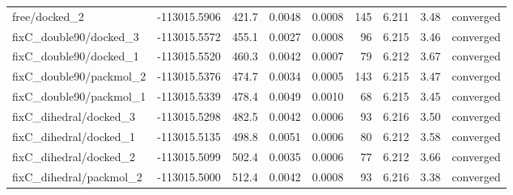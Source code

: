 \begin{longtable}{@{}lrrrrrrrl@{}}
free/docked\_2 & -113015.5906 & 421.7 & 0.0048 & 0.0008 & 145 & 6.211 & 3.48 & converged \\
fixC\_double90/docked\_3 & -113015.5572 & 455.1 & 0.0027 & 0.0008 & 96 & 6.215 & 3.46 & converged \\
fixC\_double90/docked\_1 & -113015.5520 & 460.3 & 0.0042 & 0.0007 & 79 & 6.212 & 3.67 & converged \\
fixC\_double90/packmol\_2 & -113015.5376 & 474.7 & 0.0034 & 0.0005 & 143 & 6.215 & 3.47 & converged \\
fixC\_double90/packmol\_1 & -113015.5339 & 478.4 & 0.0049 & 0.0010 & 68 & 6.215 & 3.45 & converged \\
fixC\_dihedral/docked\_3 & -113015.5298 & 482.5 & 0.0042 & 0.0006 & 93 & 6.216 & 3.50 & converged \\
fixC\_dihedral/docked\_1 & -113015.5135 & 498.8 & 0.0051 & 0.0006 & 80 & 6.212 & 3.58 & converged \\
fixC\_dihedral/docked\_2 & -113015.5099 & 502.4 & 0.0035 & 0.0006 & 77 & 6.212 & 3.66 & converged \\
fixC\_dihedral/packmol\_2 & -113015.5000 & 512.4 & 0.0042 & 0.0008 & 93 & 6.216 & 3.38 & converged \\
\end{longtable}
